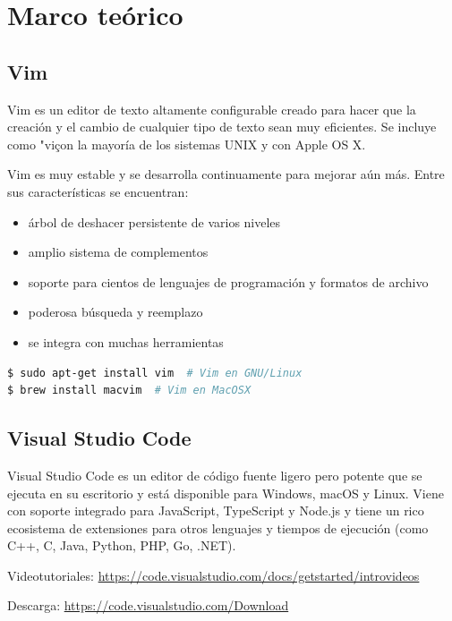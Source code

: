 \documentclass{article}
\begin{document}
\maketitle


\section{Marco teórico}

\subsection{Vim}
Vim es un editor de texto altamente configurable creado para hacer que la creación y el cambio de cualquier tipo de texto sean muy eficientes. Se incluye como "viçon la mayoría de los sistemas UNIX y con Apple OS X.

Vim es muy estable y se desarrolla continuamente para mejorar aún más. Entre sus características se encuentran:
\begin{itemize}
    \item árbol de deshacer persistente de varios niveles
    \item amplio sistema de complementos
    \item soporte para cientos de lenguajes de programación y formatos de archivo
    \item poderosa búsqueda y reemplazo
    \item se integra con muchas herramientas
\end{itemize}


\begin{lstlisting}[language=bash]
$ sudo apt-get install vim  # Vim en GNU/Linux
$ brew install macvim  # Vim en MacOSX
\end{lstlisting}

\subsection{Visual Studio Code}
Visual Studio Code es un editor de código fuente ligero pero potente que se ejecuta en su escritorio y está disponible para Windows, macOS y Linux. Viene con soporte integrado para JavaScript, TypeScript y Node.js y tiene un rico ecosistema de extensiones para otros lenguajes y tiempos de ejecución (como C++, C, Java, Python, PHP, Go, .NET).

Videotutoriales: \url{https://code.visualstudio.com/docs/getstarted/introvideos}

Descarga: \url{https://code.visualstudio.com/Download}
\end{document}

